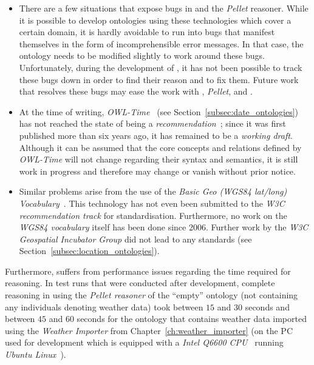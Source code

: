 \begin{itemize}
  \item There are a few situations that expose bugs in \protege and the \emph{Pellet} reasoner. While it is possible to develop ontologies using these technologies which cover a certain domain, it is hardly avoidable to run into bugs that manifest themselves in the form of incomprehensible error messages. In that case, the ontology needs to be modified slightly to work around these bugs. Unfortunately, during the development of \smarthomeweather, it has not been possible to track these bugs down in order to find their reason and to fix them. Future work that resolves these bugs may ease the work with \protege, \emph{Pellet}, and \smarthomeweather.
  
  \item At the time of writing, \emph{OWL-Time}~\cite{owl-time} (see Section~\ref{subsec:date_ontologies}) has not reached the state of being a \emph{ recommendation}~\cite{w3c-process}; since it was first published more than six years ago, it has remained to be a \emph{working draft}. Although it can be assumed that the core concepts and relations defined by \emph{OWL-Time} will not change regarding their syntax and semantics, it is still work in progress and therefore may change or vanish without prior notice.
  
  \item Similar problems arise from the use of the \emph{Basic Geo (\acs{WGS84} lat/long) Vocabulary}~\cite{wgs84_vocabulary}. This technology has not even been submitted to the \emph{\acs{W3C} recommendation track} for standardisation. Furthermore, no work on the \emph{\acs{WGS84} vocabulary} itself has been done since 2006. Further work by the \emph{\acs{W3C} Geospatial Incubator Group} did not lead to any standards (see Section~\ref{subsec:location_ontologies}).
\end{itemize}

Furthermore, \smarthomeweather suffers from performance issues regarding the time required for reasoning. In test runs that were conducted after development, complete reasoning in \protege using the \emph{Pellet reasoner} of the ``empty'' ontology (not containing any individuals denoting weather data) took between $15$ and $30$ seconds and between $45$ and $60$ seconds for the ontology that contains weather data imported using the \emph{Weather Importer} from Chapter~\ref{ch:weather_importer} (on the PC used for development which is equipped with a \emph{Intel Q6600 CPU}~\cite{intel_q6600} running \emph{Ubuntu Linux}~\cite{ubuntu}).

